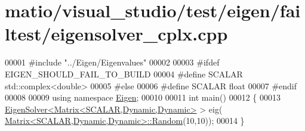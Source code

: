 \hypertarget{matio_2visual__studio_2test_2eigen_2failtest_2eigensolver__cplx_8cpp_source}{}\section{matio/visual\+\_\+studio/test/eigen/failtest/eigensolver\+\_\+cplx.cpp}
\label{matio_2visual__studio_2test_2eigen_2failtest_2eigensolver__cplx_8cpp_source}

\begin{DoxyCode}
00001 \textcolor{preprocessor}{#include "../Eigen/Eigenvalues"}
00002 
00003 \textcolor{preprocessor}{#ifdef EIGEN\_SHOULD\_FAIL\_TO\_BUILD}
00004 \textcolor{preprocessor}{#define SCALAR std::complex<double>}
00005 \textcolor{preprocessor}{#else}
00006 \textcolor{preprocessor}{#define SCALAR float}
00007 \textcolor{preprocessor}{#endif}
00008 
00009 \textcolor{keyword}{using namespace }\hyperlink{namespace_eigen}{Eigen};
00010 
00011 \textcolor{keywordtype}{int} main()
00012 \{
00013   \hyperlink{group___eigenvalues___module_class_eigen_1_1_eigen_solver}{EigenSolver<Matrix<SCALAR,Dynamic,Dynamic>} > eig(
      \hyperlink{group___core___module_class_eigen_1_1_matrix}{Matrix<SCALAR,Dynamic,Dynamic>::Random}(10,10));
00014 \}
\end{DoxyCode}
